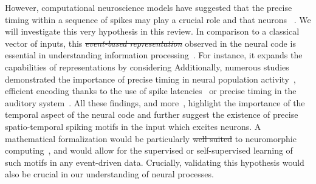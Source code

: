 \documentclass[brainsci, %
               review,accept,pdftex,moreauthors %
               ]{Definitions/mdpi}
\providecommand{\DIFadd}[1]{{\protect\color{blue}\uwave{#1}}} %
\providecommand{\DIFdel}[1]{{\protect\color{red}\sout{#1}}}                      %
\providecommand{\DIFaddbegin}{} %
\providecommand{\DIFaddend}{} %
\providecommand{\DIFdelbegin}{} %
\providecommand{\DIFdelend}{} %
\newcommand{\DIFscaledelfig}{0.5}
\newlength{\DIFdelgraphicswidth} %
\newlength{\DIFdelgraphicsheight} %
\newcommand{\DIFaddincludegraphics}[2][]{{\color{blue}\fbox{\DIFOincludegraphics[#1]{#2}}}} %
\newcommand{\DIFdelincludegraphics}[2][]{%
\sbox{\DIFdelgraphicsbox}{\DIFOincludegraphics[#1]{#2}}%
\settoboxwidth{\DIFdelgraphicswidth}{\DIFdelgraphicsbox} %
\settoboxtotalheight{\DIFdelgraphicsheight}{\DIFdelgraphicsbox} %
\scalebox{\DIFscaledelfig}{%
\parbox[b]{\DIFdelgraphicswidth}{\usebox{\DIFdelgraphicsbox}\\[-\baselineskip] \rule{\DIFdelgraphicswidth}{0em}}\llap{\resizebox{\DIFdelgraphicswidth}{\DIFdelgraphicsheight}{%
\setlength{\unitlength}{\DIFdelgraphicswidth}%
\begin{picture}(1,1)%
\thicklines\linethickness{2pt} %
{\color[rgb]{1,0,0}\put(0,0){\framebox(1,1){}}}%
{\color[rgb]{1,0,0}\put(0,0){\line( 1,1){1}}}%
{\color[rgb]{1,0,0}\put(0,1){\line(1,-1){1}}}%
\end{picture}%
}\hspace*{3pt}}} %
} %
\DeclareRobustCommand{\DIFaddbegin}{\DIFOaddbegin \let\includegraphics\DIFaddincludegraphics} %
\DeclareRobustCommand{\DIFaddend}{\DIFOaddend \let\includegraphics\DIFOincludegraphics} %
\DeclareRobustCommand{\DIFdelbegin}{\DIFOdelbegin \let\includegraphics\DIFdelincludegraphics} %
\DeclareRobustCommand{\DIFdelend}{\DIFOaddend \let\includegraphics\DIFOincludegraphics} %
\begin{document}
However, computational neuroscience models have suggested that the precise timing within a sequence of spikes may play a crucial role and that neurons ~\citep{abeles_role_1982}.  We will investigate this very hypothesis in this review. %
In comparison to a classical  vector of inputs, this \DIFdelbegin \emph{\DIFdel{event-based representation}} %
\DIFdelend \DIFaddbegin \DIFadd{event-based representation }\DIFaddend observed in the neural code is essential in understanding information processing~\citep{carr_processing_1993}. For instance, it expands the capabilities of representations  by considering   Additionally, numerous studies \DIFaddbegin \DIFadd{have }\DIFaddend demonstrated the importance of precise timing in neural population activity~\citep{davis_spontaneous_2021}, efficient encoding thanks to the use of spike latencies~\citep{perrinet_coding_2004,gollisch_rapid_2008} or precise timing in the auditory system~\citep{deweese_binary_2003,carr_circuit_1990}. All these findings, and more~\citep{bohte_evidence_2004,dilorenzo_spike_2013}, highlight the importance of the temporal aspect of the neural code and further suggest the existence of precise spatio-temporal spiking motifs in the input which excites neurons. A mathematical formalization would be particularly \DIFdelbegin \DIFdel{well suited }\DIFdelend \DIFaddbegin \DIFadd{well-suited }\DIFaddend to neuromorphic computing~\citep{roy_towards_2019}, and would allow for the supervised or self-supervised learning of such motifs in any event-driven data.  Crucially, validating this hypothesis would also be crucial in our understanding of neural processes. %
%
\end{document}
